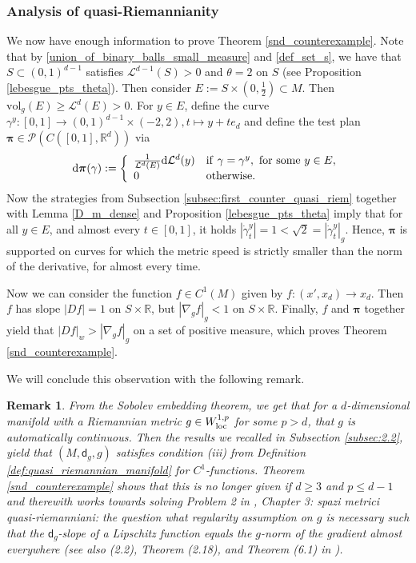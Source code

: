 \documentclass[a4paper,10pt]{article}
\newtheorem{remark}[theorem]{Remark}
\numberwithin{equation}{section}
\newcommand{\R}{\mathbb{R}}
\newcommand{\vol}{\mathrm{vol}}
\newcommand{\sfd}{\mathsf d}
\newcommand{\di}{{\rm d}}
\begin{document}
\subsubsection{Analysis of quasi-Riemannianity}\label{subsub_quasi_riem}
We now have enough information to prove Theorem \ref{snd_counterexample}.
Note that by \eqref{union_of_binary_balls_small_measure} and \eqref{def_set_s}, we have that $S \subset (0,1)^{d-1}$ satisfies $\mathcal{L}^{d-1}(S)>0$ and $\theta = 2$ on $S$ (see Proposition \ref{lebesgue_pts_theta}).
Then consider $E := S \times (0,\frac{1}{2}) \subset M$. Then $\vol_g(E)\geq \mathcal{L}^d(E) >0$. For $y \in E$, define the curve $\gamma^y:[0,1] \to (0,1)^{d-1} \times (-2, 2), t \mapsto y+ te_d$ and define the test plan $\boldsymbol{\pi} \in \mathcal{P}(C([0,1], \R^d))$ via
\begin{align*}
    \di\boldsymbol{\pi}(\gamma):= \left\{ \begin{array}{ll}
           \frac{1}{\mathcal{L}^d(E)}\di\mathcal{L}^d(y) & \mathrm{if}\ \gamma = \gamma^{y}, \ \mathrm{for \ some} \ y \in  E, \\
           0\  & \mathrm{otherwise}.
        \end{array}\right.
\end{align*}
Now the strategies from Subsection \ref{subsec:first_counter_quasi_riem} together with Lemma \ref{D_m_dense} and Proposition \ref{lebesgue_pts_theta} imply that for all $y \in E$, and almost every $t \in [0,1]$, it holds $|\dot{\gamma}^y_t|=1 < \sqrt{2} = |\dot{\gamma}^y_t|_g$. Hence, $\boldsymbol{\pi}$ is supported on curves for which the metric speed is strictly smaller than the norm of the derivative, for almost every time. 

Now we can consider the function $f\in C^1(M)$ given by $f:(x', x_d) \to x_d$. Then $f$ has slope $|Df|=1$ on $S \times \R$, but $|\nabla_g f|_g <1$ on $S \times \R$. 
Finally, $f$ and $\boldsymbol{\pi}$ together yield that $|Df|_w > |\nabla_g f|_g$ on a set of positive measure, which proves Theorem \ref{snd_counterexample}.

We will conclude this observation with the following remark.

\smallskip
\begin{remark}
    From the Sobolev embedding theorem, we get that for a $d$-dimensional manifold with a Riemannian metric $g \in W^{1,p}_{\rm loc}$ for some $p > d$, that $g$ is automatically continuous. Then the results we recalled in Subsection \ref{subsec:2.2}, yield that $(M, \sfd_g, g)$ satisfies condition (iii) from Definition \ref{def:quasi_riemannian_manifold} for $C^1$-functions. Theorem \ref{snd_counterexample} shows that this is no longer given if $d \geq 3$ and $p \leq d-1$ and therewith works towards solving Problem 2 in \cite{de1990conversazioni}, Chapter 3: spazi metrici quasi-riemanniani: the question what regularity assumption on $g$ is necessary such that the $\sfd_g$-slope of a Lipschitz function equals the $g$-norm of the gradient almost everywhere  (see also (2.2), Theorem (2.18), and Theorem (6.1) in \cite{de1991integral}). 
\end{remark}
\end{document}
